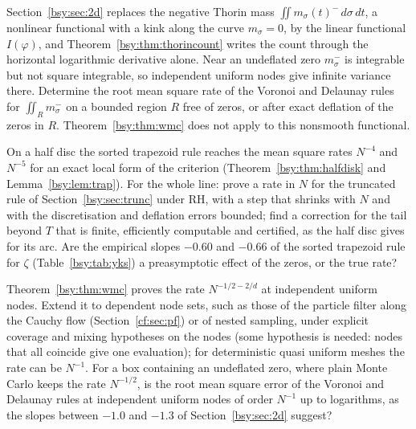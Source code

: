 \begin{problem}\label{bsy:op:2d}
Section~\ref{bsy:sec:2d} replaces the negative Thorin mass $\iint m_\sigma(t)^-\,d\sigma\,dt$, a nonlinear functional with a kink along the curve $m_\sigma=0$, by the linear functional $I(\varphi)$, and Theorem~\ref{bsy:thm:thorincount} writes the count through the horizontal logarithmic derivative alone. Near an undeflated zero $m_\sigma^-$ is integrable but not square integrable, so independent uniform nodes give infinite variance there. Determine the root mean square rate of the Voronoi and Delaunay rules for $\iint_Rm_\sigma^-$ on a bounded region $R$ free of zeros, or after exact deflation of the zeros in $R$. Theorem~\ref{bsy:thm:wmc} does not apply to this nonsmooth functional.
\end{problem}

\begin{problem}\label{bsy:op:line}
On a half disc the sorted trapezoid rule reaches the mean square rates $N^{-4}$ and $N^{-5}$ for an exact local form of the criterion (Theorem~\ref{bsy:thm:halfdisk} and Lemma~\ref{bsy:lem:trap}). For the whole line: prove a rate in $N$ for the truncated rule of Section~\ref{bsy:sec:trunc} under RH, with a step that shrinks with $N$ and with the discretisation and deflation errors bounded; find a correction for the tail beyond $T$ that is finite, efficiently computable and certified, as the half disc gives for its arc. Are the empirical slopes $-0.60$ and $-0.66$ of the sorted trapezoid rule for $\zeta$ (Table~\ref{bsy:tab:yks}) a preasymptotic effect of the zeros, or the true rate?
\end{problem}

\begin{problem}\label{bsy:op:rates}
Theorem~\ref{bsy:thm:wmc} proves the rate $N^{-1/2-2/d}$ at independent uniform nodes. Extend it to dependent node sets, such as those of the particle filter along the Cauchy flow (Section~\ref{cf:sec:pf}) or of nested sampling, under explicit coverage and mixing hypotheses on the nodes (some hypothesis is needed: nodes that all coincide give one evaluation); for deterministic quasi uniform meshes the rate can be $N^{-1}$. For a box containing an undeflated zero, where plain Monte Carlo keeps the rate $N^{-1/2}$, is the root mean square error of the Voronoi and Delaunay rules at independent uniform nodes of order $N^{-1}$ up to logarithms, as the slopes between $-1.0$ and $-1.3$ of Section~\ref{bsy:sec:2d} suggest?
\end{problem}

